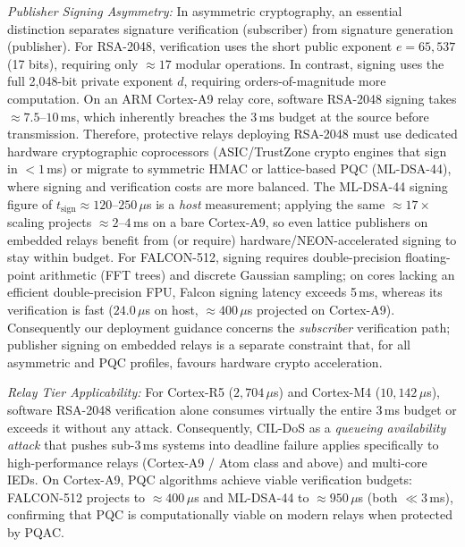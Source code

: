\documentclass[journal]{IEEEtran}
\begin{document}
\textit{Publisher Signing Asymmetry:} In asymmetric cryptography, an essential distinction separates signature verification (subscriber) from signature generation (publisher). For RSA-2048, verification uses the short public exponent $e = 65,537$ (17 bits), requiring only $\approx 17$ modular operations. In contrast, signing uses the full 2,048-bit private exponent $d$, requiring orders-of-magnitude more computation. On an ARM Cortex-A9 relay core, software RSA-2048 signing takes $\approx 7.5\text{--}10$\,ms, which inherently breaches the 3\,ms budget at the source before transmission. Therefore, protective relays deploying RSA-2048 must use dedicated hardware cryptographic coprocessors (ASIC/TrustZone crypto engines that sign in $<1$\,ms) or migrate to symmetric HMAC or lattice-based PQC (ML-DSA-44), where signing and verification costs are more balanced. The ML-DSA-44 signing figure of $t_{\text{sign}} \approx 120\text{--}250\,\mu$s is a \emph{host} measurement; applying the same $\approx 17\times$ scaling projects $\approx 2\text{--}4$\,ms on a bare Cortex-A9, so even lattice publishers on embedded relays benefit from (or require) hardware/NEON-accelerated signing to stay within budget. For FALCON-512, signing requires double-precision floating-point arithmetic (FFT trees) and discrete Gaussian sampling; on cores lacking an efficient double-precision FPU, Falcon signing latency exceeds 5\,ms, whereas its verification is fast ($24.0\,\mu$s on host, $\approx 400\,\mu$s projected on Cortex-A9). Consequently our deployment guidance concerns the \emph{subscriber} verification path; publisher signing on embedded relays is a separate constraint that, for all asymmetric and PQC profiles, favours hardware crypto acceleration.

\textit{Relay Tier Applicability:} For Cortex-R5 ($2,704\,\mu$s) and Cortex-M4 ($10,142\,\mu$s), software RSA-2048 verification alone consumes virtually the entire 3\,ms budget or exceeds it without any attack. Consequently, CIL-DoS as a \emph{queueing availability attack} that pushes sub-3\,ms systems into deadline failure applies specifically to high-performance relays (Cortex-A9 / Atom class and above) and multi-core IEDs. On Cortex-A9, PQC algorithms achieve viable verification budgets: FALCON-512 projects to $\approx 400\,\mu$s and ML-DSA-44 to $\approx 950\,\mu$s (both $\ll 3$\,ms), confirming that PQC is computationally viable on modern relays when protected by PQAC.
\end{document}

